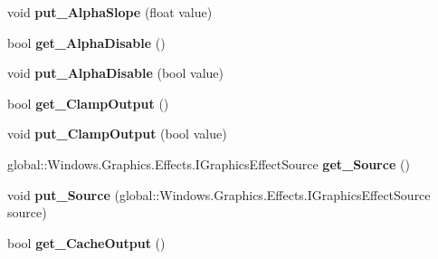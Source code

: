\begin{DoxyCompactItemize}
void {\bfseries put\+\_\+\+Alpha\+Slope} (float value)
\item 
\mbox{\label{class_microsoft_1_1_graphics_1_1_canvas_1_1_effects_1_1_linear_transfer_effect_a927e3a0868674914e4559762049edeff}} 
bool {\bfseries get\+\_\+\+Alpha\+Disable} ()
\item 
\mbox{\label{class_microsoft_1_1_graphics_1_1_canvas_1_1_effects_1_1_linear_transfer_effect_a652ca7e49961cec56a8e9cdffc0e647c}} 
void {\bfseries put\+\_\+\+Alpha\+Disable} (bool value)
\item 
\mbox{\label{class_microsoft_1_1_graphics_1_1_canvas_1_1_effects_1_1_linear_transfer_effect_af99a192609cbc8a5e3567a286dd2fdf8}} 
bool {\bfseries get\+\_\+\+Clamp\+Output} ()
\item 
\mbox{\label{class_microsoft_1_1_graphics_1_1_canvas_1_1_effects_1_1_linear_transfer_effect_a37d74d7e18b00ba5a5091ee75f369f63}} 
void {\bfseries put\+\_\+\+Clamp\+Output} (bool value)
\item 
\mbox{\label{class_microsoft_1_1_graphics_1_1_canvas_1_1_effects_1_1_linear_transfer_effect_a150d940d9e3782329842305e98b627ca}} 
global\+::\+Windows.\+Graphics.\+Effects.\+I\+Graphics\+Effect\+Source {\bfseries get\+\_\+\+Source} ()
\item 
\mbox{\label{class_microsoft_1_1_graphics_1_1_canvas_1_1_effects_1_1_linear_transfer_effect_a0e01c337f2d7fd6eddb9568ce763ab01}} 
void {\bfseries put\+\_\+\+Source} (global\+::\+Windows.\+Graphics.\+Effects.\+I\+Graphics\+Effect\+Source source)
\item 
\mbox{\label{class_microsoft_1_1_graphics_1_1_canvas_1_1_effects_1_1_linear_transfer_effect_abc4461c5a72fccd81da723e333723d75}} 
bool {\bfseries get\+\_\+\+Cache\+Output} ()

\end{DoxyCompactItemize}
